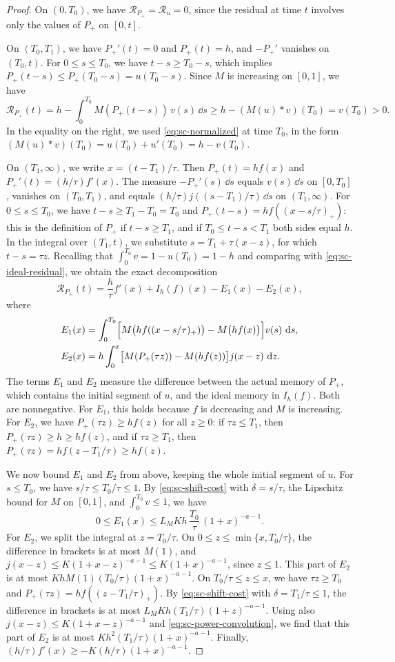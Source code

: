 \begin{proof}
On $(0,T_0)$, we have $\mathcal R_{P_+}=\mathcal R_u=0$, since the residual at time $t$ involves only the values of $P_+$ on $[0,t]$.

On $(T_0,T_1)$, we have $P_+'(t)=0$ and $P_+(t)=h$, and $-P_+'$ vanishes on $(T_0,t)$. For $0\le s\le T_0$, we have $t-s\ge T_0-s$, which implies $P_+(t-s)\le P_+(T_0-s)=u(T_0-s)$. Since $M$ is increasing on $[0,1]$, we have
\[
 \mathcal R_{P_+}(t)=h-\int_0^{T_0}M(P_+(t-s))\,v(s)\,\dd s\ge h-(M(u)*v)(T_0)=v(T_0)>0 .
\]
In the equality on the right, we used \eqref{eq:sc-normalized} at time $T_0$, in the form $(M(u)*v)(T_0)=u(T_0)+u'(T_0)=h-v(T_0)$.

On $(T_1,\infty)$, we write $x=(t-T_1)/\tau$. Then $P_+(t)=hf(x)$ and $P_+'(t)=(h/\tau)f'(x)$. The measure $-P_+'(s)\,\dd s$ equals $v(s)\,\dd s$ on $[0,T_0]$, vanishes on $(T_0,T_1)$, and equals $(h/\tau)j((s-T_1)/\tau)\,\dd s$ on $(T_1,\infty)$. For $0\le s\le T_0$, we have $t-s\ge T_1-T_0=T_0$ and $P_+(t-s)=hf((x-s/\tau)_+)$: this is the definition of $P_+$ if $t-s\ge T_1$, and if $T_0\le t-s<T_1$ both sides equal $h$. In the integral over $(T_1,t)$, we substitute $s=T_1+\tau(x-z)$, for which $t-s=\tau z$. Recalling that $\int_0^{T_0}v=1-u(T_0)=1-h$ and comparing with \eqref{eq:sc-ideal-residual}, we obtain the exact decomposition
\begin{equation}\label{eq:sc-upper-decomposition}
 \mathcal R_{P_+}(t)=\frac h\tau f'(x)+I_h(f)(x)-E_1(x)-E_2(x),
\end{equation}
where
\begin{align*}
 E_1(x)&=\int_0^{T_0}\Bigl[M\bigl(hf((x-s/\tau)_+)\bigr)-M\bigl(hf(x)\bigr)\Bigr]v(s)\,\mathop{}\!\mathrm d s,\\
 E_2(x)&=h\int_0^x\bigl[M(P_+(\tau z))-M(hf(z))\bigr]j(x-z)\,\mathop{}\!\mathrm d z .
\end{align*}
The terms $E_1$ and $E_2$ measure the difference between the actual memory of $P_+$, which contains the initial segment of $u$, and the ideal memory in $I_h(f)$. Both are nonnegative. For $E_1$, this holds because $f$ is decreasing and $M$ is increasing. For $E_2$, we have $P_+(\tau z)\ge hf(z)$ for all $z\ge0$: if $\tau z\le T_1$, then $P_+(\tau z)\ge h\ge hf(z)$, and if $\tau z\ge T_1$, then $P_+(\tau z)=hf(z-T_1/\tau)\ge hf(z)$.

We now bound $E_1$ and $E_2$ from above, keeping the whole initial segment of $u$. For $s\le T_0$, we have $s/\tau\le T_0/\tau\le1$. By \eqref{eq:sc-shift-cost} with $\delta=s/\tau$, the Lipschitz bound for $M$ on $[0,1]$, and $\int_0^{T_0}v\le1$, we have
\[
 0\le E_1(x)\le L_MKh\,\frac{T_0}\tau\,(1+x)^{-a-1}.
\]
For $E_2$, we split the integral at $z=T_0/\tau$. On $0\le z\le\min\{x,T_0/\tau\}$, the difference in brackets is at most $M(1)$, and $j(x-z)\le K(1+x-z)^{-a-1}\le K(1+x)^{-a-1}$, since $z\le1$. This part of $E_2$ is at most $KhM(1)(T_0/\tau)(1+x)^{-a-1}$. On $T_0/\tau\le z\le x$, we have $\tau z\ge T_0$ and $P_+(\tau z)=hf((z-T_1/\tau)_+)$. By \eqref{eq:sc-shift-cost} with $\delta=T_1/\tau\le1$, the difference in brackets is at most $L_MKh(T_1/\tau)(1+z)^{-a-1}$. Using also $j(x-z)\le K(1+x-z)^{-a-1}$ and \eqref{eq:sc-power-convolution}, we find that this part of $E_2$ is at most $Kh^2(T_1/\tau)(1+x)^{-a-1}$. Finally, $(h/\tau)f'(x)\ge-K(h/\tau)(1+x)^{-a-1}$.


\end{proof}
